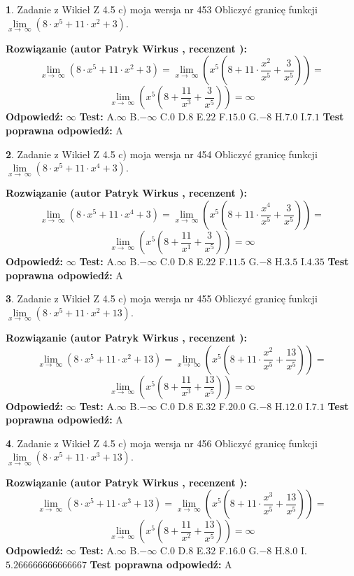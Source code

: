 \documentclass[12pt, a4paper]{article}
\theoremstyle{definition} %
\newtheorem{zad}{}
\newcommand{\zadStart}[1]{\begin{zad}#1\newline}
\newcommand{\zadStop}{\end{zad}}
\newcommand{\rozwStart}[2]{\noindent \textbf{Rozwiązanie (autor #1 , recenzent #2): }\newline}
\newcommand{\rozwStop}{\newline}
\newcommand{\odpStart}{\noindent \textbf{Odpowiedź:}\newline}
\newcommand{\odpStop}{\newline}
\newcommand{\testStart}{\noindent \textbf{Test:}\newline}
\newcommand{\testStop}{\newline}
\newcommand{\kluczStart}{\noindent \textbf{Test poprawna odpowiedź:}\newline}
\newcommand{\kluczStop}{\newline}
\begin{document}
\zadStart{Zadanie z Wikieł Z 4.5 c) moja wersja nr 453}
Obliczyć granicę funkcji  $\lim\limits_{x\to\ \infty}(8 \cdot x^{5}+11 \cdot x^{2}+3)$.
\zadStop
\rozwStart{Patryk Wirkus}{}
$$\lim\limits_{x\to\ \infty}(8 \cdot x^{5}+11 \cdot x^{2}+3) = \lim\limits_{x\to\ \infty}(x^{5}(8 +11 \cdot \frac{x^{2}}{x^{5}}+\frac{3}{x^{5}})) =$$ $$\lim\limits_{x\to\ \infty}(x^{5}(8 +\frac{11}{x^{3}}+\frac{3}{x^{5}})) =\infty$$
\rozwStop
\odpStart
$\infty$
\odpStop
\testStart
A.$\infty$ B.$-\infty$ C.$0$ D.$8$ E.$22$
F.$15.0$ G.$-8$
H.$7.0$
I.$7.1$
\testStop
\kluczStart
A
\kluczStop



\zadStart{Zadanie z Wikieł Z 4.5 c) moja wersja nr 454}
Obliczyć granicę funkcji  $\lim\limits_{x\to\ \infty}(8 \cdot x^{5}+11 \cdot x^{4}+3)$.
\zadStop
\rozwStart{Patryk Wirkus}{}
$$\lim\limits_{x\to\ \infty}(8 \cdot x^{5}+11 \cdot x^{4}+3) = \lim\limits_{x\to\ \infty}(x^{5}(8 +11 \cdot \frac{x^{4}}{x^{5}}+\frac{3}{x^{5}})) =$$ $$\lim\limits_{x\to\ \infty}(x^{5}(8 +\frac{11}{x^{1}}+\frac{3}{x^{5}})) =\infty$$
\rozwStop
\odpStart
$\infty$
\odpStop
\testStart
A.$\infty$ B.$-\infty$ C.$0$ D.$8$ E.$22$
F.$11.5$ G.$-8$
H.$3.5$
I.$4.35$
\testStop
\kluczStart
A
\kluczStop



\zadStart{Zadanie z Wikieł Z 4.5 c) moja wersja nr 455}
Obliczyć granicę funkcji  $\lim\limits_{x\to\ \infty}(8 \cdot x^{5}+11 \cdot x^{2}+13)$.
\zadStop
\rozwStart{Patryk Wirkus}{}
$$\lim\limits_{x\to\ \infty}(8 \cdot x^{5}+11 \cdot x^{2}+13) = \lim\limits_{x\to\ \infty}(x^{5}(8 +11 \cdot \frac{x^{2}}{x^{5}}+\frac{13}{x^{5}})) =$$ $$\lim\limits_{x\to\ \infty}(x^{5}(8 +\frac{11}{x^{3}}+\frac{13}{x^{5}})) =\infty$$
\rozwStop
\odpStart
$\infty$
\odpStop
\testStart
A.$\infty$ B.$-\infty$ C.$0$ D.$8$ E.$32$
F.$20.0$ G.$-8$
H.$12.0$
I.$7.1$
\testStop
\kluczStart
A
\kluczStop



\zadStart{Zadanie z Wikieł Z 4.5 c) moja wersja nr 456}
Obliczyć granicę funkcji  $\lim\limits_{x\to\ \infty}(8 \cdot x^{5}+11 \cdot x^{3}+13)$.
\zadStop
\rozwStart{Patryk Wirkus}{}
$$\lim\limits_{x\to\ \infty}(8 \cdot x^{5}+11 \cdot x^{3}+13) = \lim\limits_{x\to\ \infty}(x^{5}(8 +11 \cdot \frac{x^{3}}{x^{5}}+\frac{13}{x^{5}})) =$$ $$\lim\limits_{x\to\ \infty}(x^{5}(8 +\frac{11}{x^{2}}+\frac{13}{x^{5}})) =\infty$$
\rozwStop
\odpStart
$\infty$
\odpStop
\testStart
A.$\infty$ B.$-\infty$ C.$0$ D.$8$ E.$32$
F.$16.0$ G.$-8$
H.$8.0$
I.$5.266666666666667$
\testStop
\kluczStart
A
\kluczStop
\end{document}
